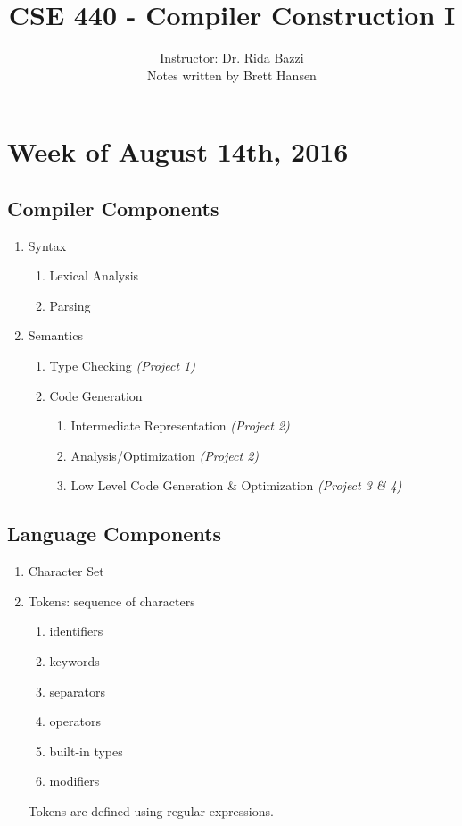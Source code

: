 \documentclass{article}
\title{CSE 440 - Compiler Construction I}
\author{
{\large Instructor: Dr. Rida Bazzi} \\
		Notes written by Brett Hansen
}
\date{}
\begin{document}
\maketitle
\tableofcontents
\break

\section{Week of August 14th, 2016}
\subsection{Compiler Components}

\begin{enumerate}
	\item Syntax
	\begin{enumerate}
		\item Lexical Analysis
		\item Parsing
	\end{enumerate}
	\item Semantics
	\begin{enumerate}
		\item Type Checking \textit{(Project 1)}
		\item Code Generation
		\begin{enumerate}
			\item Intermediate Representation \textit{(Project 2)}
			\item Analysis/Optimization \textit{(Project 2)}
			\item Low Level Code Generation \& Optimization \textit{(Project 3 \& 4)}
		\end{enumerate}
	\end{enumerate}
\end{enumerate}

\subsection{Language Components}

\begin{enumerate}
	\item Character Set
	\item Tokens: sequence of characters
	\begin{enumerate}
		\item identifiers
		\item keywords
		\item separators
		\item operators
		\item built-in types
		\item modifiers
	\end{enumerate}
	Tokens are defined using regular expressions.
\end{enumerate}
\end{document}
